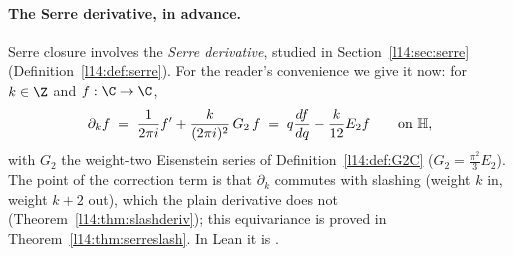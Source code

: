 \paragraph{The Serre derivative, in advance.} Serre closure involves the \emph{Serre derivative}, studied in
Section~\ref{l14:sec:serre} (Definition~\ref{l14:def:serre}). For the reader's convenience we give it now: for $k\in\Z$ and
$f:\C\to\C$,
\begin{equation*}
  \partial_kf \;=\; \frac{1}{2\pi i}f' + \frac{k}{(2\pi i)^2}\,G_2\,f \;=\; q\frac{df}{dq} - \frac{k}{12}E_2f\qquad\text{on }\mathbb{H},
\end{equation*}
with $G_2$ the weight-two Eisenstein series of Definition~\ref{l14:def:G2C} ($G_2 = \frac{\pi^2}3E_2$). The point of the
correction term is that $\partial_k$ commutes with slashing (weight $k$ in, weight $k+2$ out), which the plain derivative does
not (Theorem~\ref{l14:thm:slashderiv}); this equivariance is proved in Theorem~\ref{l14:thm:serreslash}. In Lean it is
.

